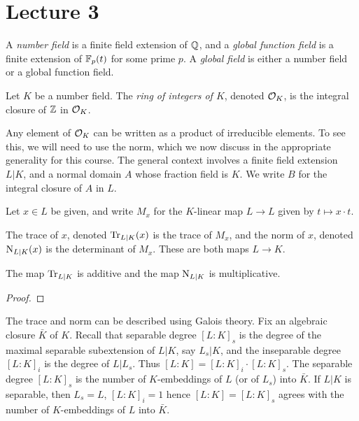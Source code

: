 \section{Lecture 3}

\begin{definition}
  A \emph{number field} is a finite field extension of $\mathbb{Q}$, and a \emph{global function field} is a finite extension of $\mathbb{F}_{p}(t)$ for some prime $p$.
  A \emph{global field} is either a number field or a global function field.
\end{definition}

\begin{definition}
  Let $K$ be a number field.
  The \emph{ring of integers of $K$}, denoted $\mathcal{O}_{K}$, is the integral closure of $\mathbb{Z}$ in $\mathcal{O}_{K}$.
\end{definition}

Any element of $\mathcal{O}_{K}$ can be written as a product of irreducible elements.
To see this, we will need to use the norm, which we now discuss in the appropriate generality for this course.
The general context involves a finite field extension $L|K$, and a normal domain $A$ whose fraction field is $K$.
We write $B$ for the integral closure of $A$ in $L$.

Let $x \in L$ be given, and write $M_{x}$ for the $K$-linear map $L \to L$ given by $t \mapsto x \cdot t$.
\begin{definition}
  The trace of $x$, denoted $\operatorname{Tr}_{L|K}(x)$ is the trace of $M_{x}$, and the norm of $x$, denoted $\operatorname{N}_{L|K}(x)$ is the determinant of $M_{x}$.
  These are both maps $L \to K$.
\end{definition}

\begin{lemma}
  The map $\operatorname{Tr}_{L|K}$ is additive and the map $\operatorname{N}_{L|K}$ is multiplicative.
\end{lemma}
\begin{proof}
\end{proof}

The trace and norm can be described using Galois theory.
Fix an algebraic closure $\bar K$ of $K$.
Recall that separable degree $[L:K]_{s}$ is the degree of the maximal separable subextension of $L|K$, say $L_{s}|K$, and the inseparable degree $[L:K]_{i}$ is the degree of $L|L_{s}$.
Thus $[L:K] = [L:K]_{i} \cdot [L:K]_{s}$.
The separable degree $[L:K]_{s}$ is the number of $K$-embeddings of $L$ (or of $L_{s}$) into $\bar K$.
If $L|K$ is separable, then $L_{s} = L$, $[L:K]_{i} = 1$ hence $[L:K] = [L:K]_{s}$ agrees with the number of $K$-embeddings of $L$ into $\bar K$.

